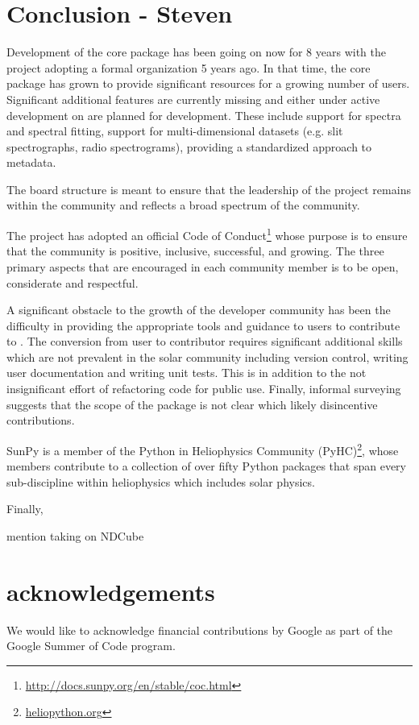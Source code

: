 \section{Conclusion - Steven}
\label{sec:conclusion}
Development of the \sunpypkg core package has been going on now for 8 years with the project adopting a formal organization 5 years ago. In that time, the core package has grown to provide significant resources for a growing number of users. Significant additional features are currently missing and either under active development on are planned for development. These include support for spectra and spectral fitting, support for multi-dimensional datasets (e.g. slit spectrographs, radio spectrograms), providing a standardized approach to metadata.

The board structure is meant to ensure that the leadership of the project remains within the community and reflects a broad spectrum of the community.


The project has adopted an official Code of Conduct\footnote{\url{http://docs.sunpy.org/en/stable/coc.html}} whose purpose is to ensure that the \sunpy community is positive, inclusive, successful, and growing. The three primary aspects that are encouraged in each community member is to be open, considerate and respectful. 

A significant obstacle to the growth of the developer community has been the difficulty in providing the appropriate tools and guidance to users to contribute to \sunpypkg. The conversion from user to contributor requires significant additional skills which are not prevalent in the solar community including version control, writing user documentation and writing unit tests. This is in addition to the not insignificant effort of refactoring code for public use. Finally, informal surveying suggests that the scope of the \sunpypkg package is not clear which likely disincentive contributions. 

SunPy is a member of the Python in Heliophysics Community (PyHC)\footnote{\url{heliopython.org}}, whose members contribute to a collection of over fifty Python packages that span every sub-discipline within heliophysics which includes solar physics. 

Finally, 


mention taking on NDCube

\section{acknowledgements}
We would like to acknowledge financial contributions by Google as part of the Google Summer of Code program.